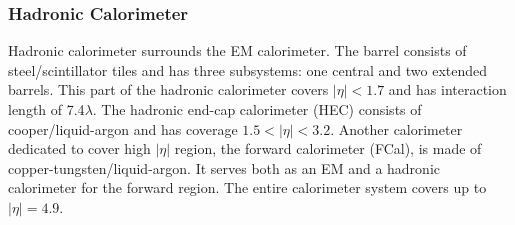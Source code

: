 \subsubsection{Hadronic Calorimeter}

Hadronic calorimeter surrounds the EM calorimeter. The barrel consists of steel/scintillator tiles and has three subsystems: one central and two extended barrels\cite{ATLASDetector}. This part of the hadronic calorimeter covers $|\eta|<1.7$ and has interaction length of 7.4$\lambda$. The hadronic end-cap calorimeter (HEC) consists of cooper/liquid-argon and has coverage $1.5<|\eta|<3.2$\cite{ATLASDetector}. Another calorimeter dedicated to cover high $|\eta|$ region, the forward calorimeter (FCal), is made of copper-tungsten/liquid-argon\cite{ATLASDetector}. It serves both as an EM and a hadronic calorimeter for the forward region. The entire calorimeter system covers up to $|\eta|=4.9$.




